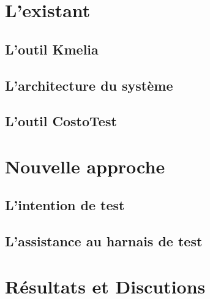 \documentclass[
10pt, %
a4paper, %
oneside, %
headinclude,footinclude, %
BCOR5mm, %
]{article}
\begin{document}
\newpage 
\section{L'existant}

\subsection{L'outil Kmelia}

\lipsum[5] %

\subsection{L'architecture du système}

\lipsum[5] %

\subsection{L'outil CostoTest}

\lipsum[5] %


\newpage 
\section{Nouvelle approche}
\lipsum[5] %

\subsection{L'intention de test}
\lipsum[5] %

\subsection{L'assistance au harnais de test}
\lipsum[5] %



\newpage 
\section{Résultats et Discutions}



\lipsum[10] %



\renewcommand{\refname}{\spacedlowsmallcaps{References}} %
\newpage 



\end{document}
